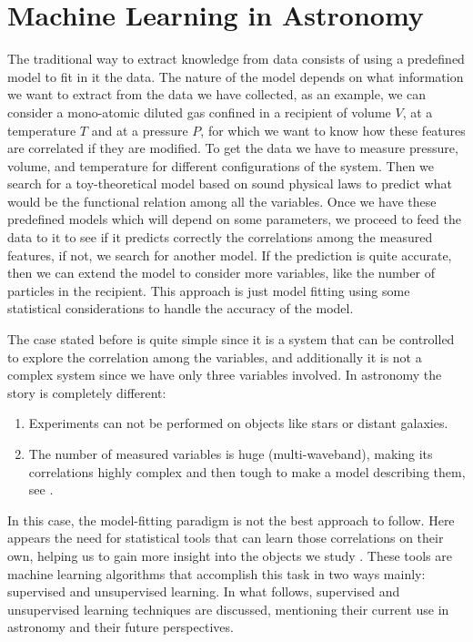 \section{Machine Learning in Astronomy}

The traditional way to extract knowledge from data consists of using a predefined model to fit in it the data. The nature of the model depends on what information we want to extract from the data we have collected, as an example, we can consider a mono-atomic diluted gas confined in a recipient of volume $V$, at a temperature $T$ and at a pressure $P$, for which we want to know how these features are correlated if they are modified. To get the data we have to measure pressure, volume, and temperature for different configurations of the system. Then we search for a toy-theoretical model based on sound physical laws to predict what would be the functional relation among all the variables. Once we have these predefined models which will depend on some parameters, we proceed to feed the data to it to see if it predicts correctly the correlations among the measured features, if not, we search for another model. If the prediction is quite accurate, then we can extend the model to consider more variables, like the number of particles in the recipient. This approach is just model fitting using some statistical considerations to handle the accuracy of the model.

The case stated before is quite simple since it is a system that can be controlled to explore the correlation among the variables, and additionally it is not a complex system since we have only three variables involved. In astronomy the story is  completely different: 

\begin{enumerate}
    \item Experiments can not be performed on objects like stars or distant galaxies. 
    \item The number of measured variables is huge (multi-waveband), making its correlations highly complex and then tough to make a model describing them, see \cite{DelliVeneri2019}.
\end{enumerate}

In this case, the model-fitting paradigm is not the best approach to follow. Here appears the need for statistical tools that can learn those correlations on their own, helping us to gain more insight into the objects we study \cite{Baron2019}. These tools are machine learning algorithms that accomplish this task in two ways mainly: supervised and unsupervised learning. In what follows, supervised and unsupervised learning techniques are discussed, mentioning their current use in astronomy and their future perspectives.
